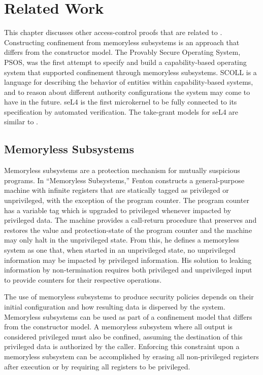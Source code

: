 \chapter{Related Work}
\label{ch:related}

This chapter discusses other access-control proofs that are related to \TMmodelName{}.
Constructing confinement from memoryless subsystems is an approach that differs from the constructor model.
The Provably Secure Operating System, PSOS, was the first attempt to specify and build a capability-based operating system that supported confinement through memoryless subsystems.
SCOLL is a language for describing the behavior of entities within capability-based systems, and to reason about different authority configurations the system may come to have in the future.
seL4 is the first microkernel to be fully connected to its specification by automated verification.
The take-grant models for seL4 are similar to \TMmodelName{}.

\section{Memoryless Subsystems}

Memoryless subsystems are a protection mechanism for mutually suspicious programs.
In ``Memoryless Subsystems,'' \cite{Fenton:MemorylessSubsystems} Fenton constructs a general-purpose machine with infinite registers that are statically tagged as privileged or unprivileged, with the exception of the program counter.
The program counter has a variable tag which is upgraded to privileged whenever impacted by privileged data.
The machine provides a call-return procedure that preserves and restores the value and protection-state of the program counter and the machine may only halt in the unprivileged state.
From this, he defines a memoryless system as one that, when started in an unprivileged state, no unprivileged information may be impacted by privileged information.
His solution to leaking information by non-termination requires both privileged and unprivileged input to provide counters for their respective operations.

The use of memoryless subsystems to produce security policies depends on their initial configuration and how resulting data is dispersed by the system.
Memoryless subsystems can be used as part of a confinement model that differs from the constructor model.
A memoryless subsystem where all output is considered privileged must also be confined, assuming the destination of this privileged data is authorized by the caller.
Enforcing this constraint upon a memoryless subsystem can be accomplished by erasing all non-privileged registers after execution or by requiring all registers to be privileged.

